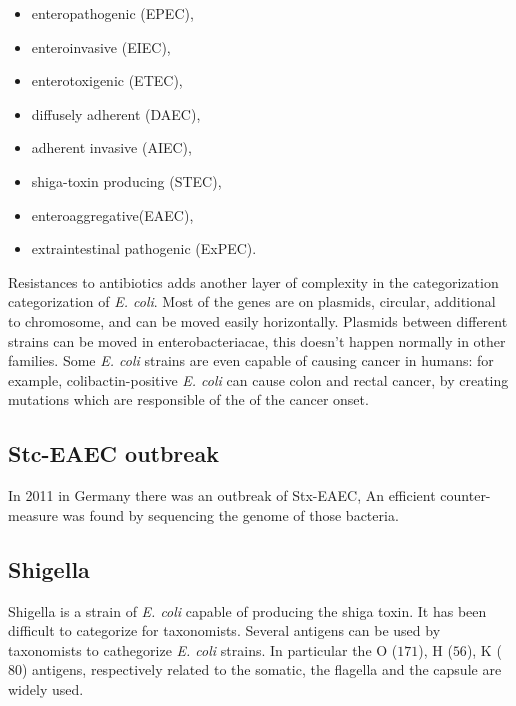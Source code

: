     \begin{multicols}{2}
        \begin{itemize}
            \item enteropathogenic (EPEC),
            \item enteroinvasive (EIEC),
            \item enterotoxigenic (ETEC),
            \item diffusely adherent (DAEC),
            \item adherent invasive (AIEC),
            \item shiga-toxin producing (STEC),
            \item enteroaggregative(EAEC),
            \item extraintestinal pathogenic (ExPEC).
        \end{itemize}
    \end{multicols}

    Resistances to antibiotics adds another layer of complexity in the categorization categorization of \emph{E. coli}.
    Most of the genes are on plasmids, circular, additional to chromosome, and can be moved easily horizontally. Plasmids between different strains can be moved in enterobacteriacae, this doesn't happen normally in other families.
    Some \emph{E. coli} strains are even capable of causing cancer in humans: for example, colibactin-positive \emph{E. coli} can cause colon and rectal cancer, by creating mutations which are responsible of the of the cancer onset.

    \subsection{Stc-EAEC outbreak}
    In 2011 in Germany there was an outbreak of Stx-EAEC,
    An efficient counter-measure was found by sequencing the genome of those bacteria.

    \subsection{Shigella}
    Shigella is a strain of \emph{E. coli} capable of producing the shiga toxin.
    It has been difficult to categorize for taxonomists.
    Several antigens can be used by taxonomists to cathegorize \emph{E. coli} strains.
    In particular the O ($171$), H ($56$), K ($80$) antigens, respectively related to the somatic, the flagella and the capsule are widely used.

